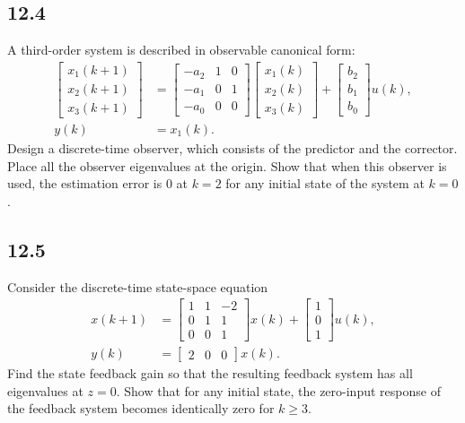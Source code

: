 \documentclass{article}
\newcommand{\problem}[2]{\subsection*{#1}}
\begin{document}
\problem{12.4}{}
A third-order system is described in observable canonical form:
\[
\begin{aligned}
\begin{bmatrix} x_1(k + 1) \\ x_2(k + 1) \\ x_3(k + 1) \end{bmatrix} &=
\begin{bmatrix} -a_2 & 1 & 0 \\ -a_1 & 0 & 1 \\ -a_0 & 0 & 0 \end{bmatrix}
\begin{bmatrix} x_1(k) \\ x_2(k) \\ x_3(k) \end{bmatrix} +
\begin{bmatrix} b_2 \\ b_1 \\ b_0 \end{bmatrix} u(k), \\
y(k) &= x_1(k).
\end{aligned}
\]
Design a discrete-time observer, which consists of the predictor and the corrector. Place all the observer eigenvalues at the origin. Show that when this observer is used, the estimation error is 0 at $k = 2$ for any initial state of the system at $k = 0$.

\problem{12.5}{}
Consider the discrete-time state-space equation
\[
\begin{aligned}
x(k + 1) &= \begin{bmatrix} 1 & 1 & -2 \\ 0 & 1 & 1 \\ 0 & 0 & 1 \end{bmatrix} x(k) + \begin{bmatrix} 1 \\ 0 \\ 1 \end{bmatrix} u(k), \\
y(k) &= \begin{bmatrix} 2 & 0 & 0 \end{bmatrix} x(k).
\end{aligned}
\]
Find the state feedback gain so that the resulting feedback system has all eigenvalues at $z = 0$. Show that for any initial state, the zero-input response of the feedback system becomes identically zero for $k \ge 3$.
\end{document}
